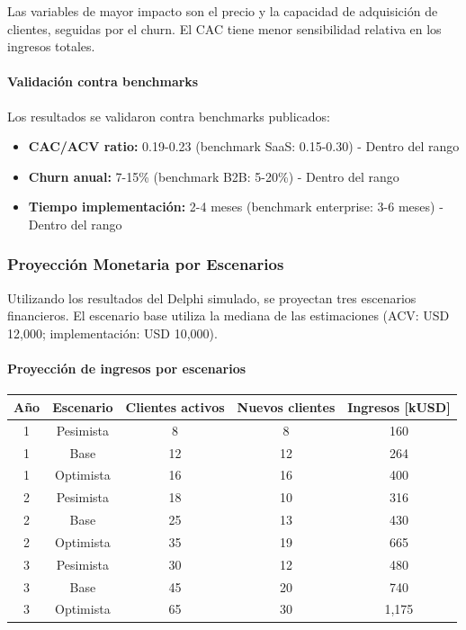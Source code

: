 Las variables de mayor impacto son el precio y la capacidad de adquisición de clientes, seguidas por el churn. El CAC tiene menor sensibilidad relativa en los ingresos totales.

\paragraph{Validación contra benchmarks}

Los resultados se validaron contra benchmarks publicados:
\begin{itemize}
    \item \textbf{CAC/ACV ratio:} 0.19-0.23 (benchmark SaaS: 0.15-0.30) - Dentro del rango
    \item \textbf{Churn anual:} 7-15\% (benchmark B2B: 5-20\%) - Dentro del rango
    \item \textbf{Tiempo implementación:} 2-4 meses (benchmark enterprise: 3-6 meses) - Dentro del rango
\end{itemize}

\subsubsection{Proyección Monetaria por Escenarios}

Utilizando los resultados del Delphi simulado, se proyectan tres escenarios financieros. El escenario base utiliza la mediana de las estimaciones (ACV: USD 12,000; implementación: USD 10,000).

\paragraph{Proyección de ingresos por escenarios}

\begin{center}
\begin{tabular}{|c|c|c|c|c|}
\hline
\textbf{Año} & \textbf{Escenario} & \textbf{Clientes activos} & \textbf{Nuevos clientes} & \textbf{Ingresos [kUSD]} \\
\hline
1 & Pesimista & 8 & 8 & 160 \\
\hline
1 & Base & 12 & 12 & 264 \\
\hline
1 & Optimista & 16 & 16 & 400 \\
\hline
2 & Pesimista & 18 & 10 & 316 \\
\hline
2 & Base & 25 & 13 & 430 \\
\hline
2 & Optimista & 35 & 19 & 665 \\
\hline
3 & Pesimista & 30 & 12 & 480 \\
\hline
3 & Base & 45 & 20 & 740 \\
\hline
3 & Optimista & 65 & 30 & 1,175 \\
\hline
\end{tabular}
\end{center}

